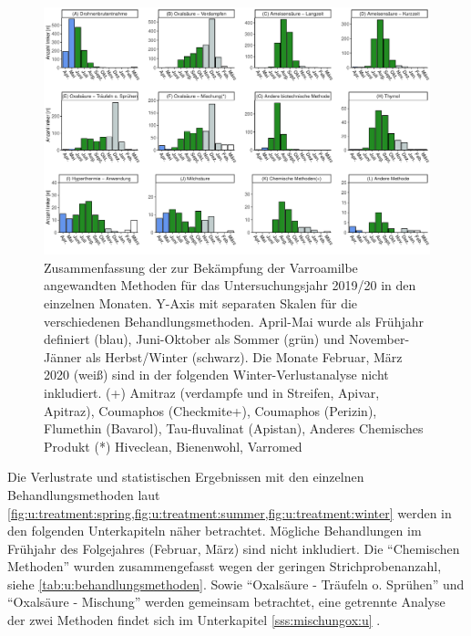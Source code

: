 \begin{figure}[H]
  \centering
  \includegraphics[keepaspectratio,width=1\textwidth]{project-U-wintersterblichkeit/figures/plot_treatment_histogramm}
  \caption{Zusammenfassung der zur Bekämpfung der Varroamilbe angewandten Methoden für das Untersuchungsjahr 2019/20 in den einzelnen Monaten. Y-Axis mit separaten Skalen für die verschiedenen Behandlungsmethoden. April-Mai wurde als Frühjahr definiert (blau), Juni-Oktober als Sommer (grün) und November-Jänner als Herbst/Winter (schwarz). Die Monate Februar, März 2020 (weiß) sind in der folgenden Winter-Verlustanalyse nicht inkludiert. 
  \newline 
  (+) Amitraz (verdampfe und in Streifen, Apivar, Apitraz), Coumaphos (Checkmite+), Coumaphos (Perizin), Flumethin (Bavarol), Tau-fluvalinat (Apistan), Anderes Chemisches Produkt  
  \newline 
  (*) Hiveclean, Bienenwohl, Varromed}
  \label{fig:u:treatment:histogramm}
\end{figure}


Die Verlustrate und statistischen Ergebnissen mit den einzelnen Behandlungsmethoden laut \cref{fig:u:treatment:spring,fig:u:treatment:summer,fig:u:treatment:winter} werden in den folgenden Unterkapiteln näher betrachtet. Mögliche Behandlungen im Frühjahr des Folgejahres (Februar, März) sind nicht inkludiert. Die \enquote{Chemischen Methoden} wurden zusammengefasst wegen der geringen Strichprobenanzahl, siehe \cref{tab:u:behandlungsmethoden}. Sowie \enquote{Oxalsäure - Träufeln o. Sprühen} und \enquote{Oxalsäure - Mischung} werden gemeinsam betrachtet, eine getrennte Analyse der zwei Methoden findet sich im Unterkapitel \ref{sss:mischungox:u} .

